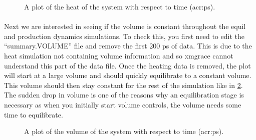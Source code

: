     \begin{figure}[H]
        \centering
        \caption{A plot of the heat of the system with respect to time (\gls{acr:ps}).}
        \label{fig:Temp}
    \end{figure}

    \paragraph{}
        Next we are interested in seeing if the volume is constant throughout the equil and production dynamics simulations. To check this, you first need to edit the \enquote{summary.VOLUME} file and remove the first 200 ps of data. This is due to the heat simulation not containing volume information and so xmgrace cannot understand this part of the data file. Once the heating data is removed, the plot will start at a large volume and should quickly equilibrate to a constant volume. This volume should then stay constant for the rest of the simulation like in \cref{fig:Vol}. The sudden drop in volume is one of the reasons why an equilibration stage is necessary as when you initially start volume controls, the volume needs some time to equilibrate.

    \begin{figure}[H]
        \centering
        \caption{A plot of the volume of the system with respect to time (\gls{acr:ps}).}
        \label{fig:Vol}
    \end{figure}

